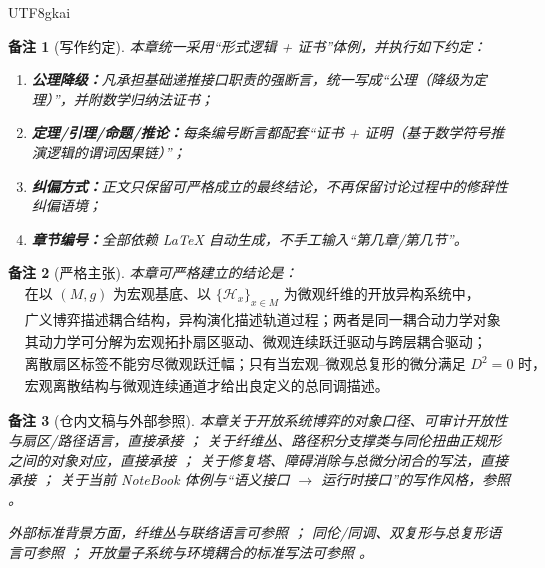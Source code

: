 \documentclass[12pt]{article}
\newtheorem{remark}{备注}[section]
\begin{document}
\begin{CJK*}{UTF8}{gkai}
\begin{remark}[写作约定]
本章统一采用“形式逻辑 + 证书”体例，并执行如下约定：
\begin{enumerate}
  \item \textbf{公理降级：}凡承担基础递推接口职责的强断言，统一写成“公理（降级为定理）”，并附数学归纳法证书；
  \item \textbf{定理/引理/命题/推论：}每条编号断言都配套“证书 + 证明（基于数学符号推演逻辑的谓词因果链）”；
  \item \textbf{纠偏方式：}正文只保留可严格成立的最终结论，不再保留讨论过程中的修辞性纠偏语境；
  \item \textbf{章节编号：}全部依赖 \LaTeX{} 自动生成，不手工输入“第几章/第几节”。
\end{enumerate}
\end{remark}

\begin{remark}[严格主张]
本章可严格建立的结论是：
\[
  \boxed{
    \begin{aligned}
      &\text{在以 }(M,g)\text{ 为宏观基底、以 }\{\mathcal H_x\}_{x\in M}\text{ 为微观纤维的开放异构系统中，}\\
      &\text{广义博弈描述耦合结构，异构演化描述轨道过程；两者是同一耦合动力学对象的两种投影；}\\
      &\text{其动力学可分解为宏观拓扑扇区驱动、微观连续跃迁驱动与跨层耦合驱动；}\\
      &\text{离散扇区标签不能穷尽微观跃迁幅；只有当宏观--微观总复形的微分满足 }D^2=0\text{ 时，}\\
      &\text{宏观离散结构与微观连续通道才给出良定义的总同调描述。}
    \end{aligned}
  }
\]
\end{remark}

\begin{remark}[仓内文稿与外部参照]
本章关于开放系统博弈的对象口径、可审计开放性与扇区/路径语言，直接承接
\cite{RepoTex23OpenSystemGame,RepoTex39StatRepair}；
关于纤维丛、路径积分支撑类与同伦扭曲正规形之间的对象对应，直接承接
\cite{RepoTex36HomotopyTwistBijection}；
关于修复塔、障碍消除与总微分闭合的写法，直接承接
\cite{RepoTex38JacobiBianchiRepair,GaoZheng2025GFramework}；
关于当前 NoteBook 体例与“语义接口 $\to$ 运行时接口”的写作风格，参照
\cite{RepoTex37SemanticGaugeRuntime,GaoZhengAppVol3}。

外部标准背景方面，纤维丛与联络语言可参照
\cite{KobayashiNomizu1963Foundations,Husemoller1994FibreBundles}；
同伦/同调、双复形与总复形语言可参照
\cite{Hatcher2002AT,Weibel1994HomologicalAlgebra}；
开放量子系统与环境耦合的标准写法可参照
\cite{BreuerPetruccione2002OpenQuantumSystems}。
\end{remark}


\end{CJK*}
\end{document}
